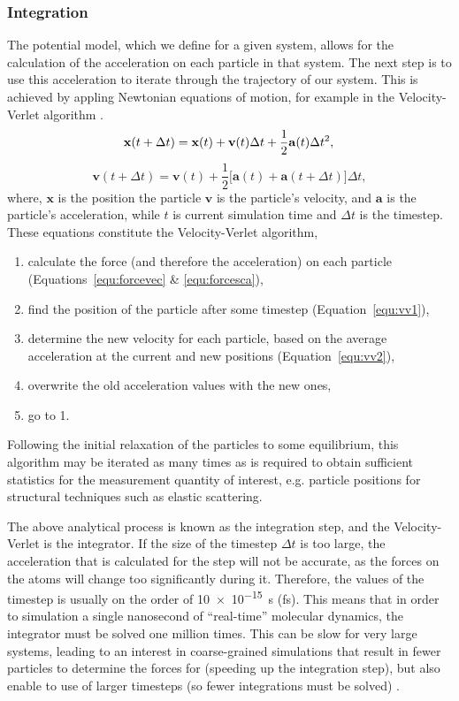 \subsubsection{Integration}
The potential model, which we define for a given system, allows for the calculation of the acceleration on each particle in that system.
The next step is to use this acceleration to iterate through the trajectory of our system.
This is achieved by appling Newtonian equations of motion, for example in the Velocity-Verlet algorithm \cite{swope_computer_1982}.
%
\begin{equation}
\mathbf{x}(t + \Delta t) = \mathbf{x}(t) + \mathbf{v}(t)\Delta t + \frac{1}{2}\mathbf{a}(t)\Delta t^2, \\
\label{equ:vv1}
\end{equation}
\begin{equation}
\mathbf{v}(t + \Delta t) = \mathbf{v}(t) + \frac{1}{2}\big[\mathbf{a}(t) + \mathbf{a}(t+\Delta t)\big]\Delta t,
\label{equ:vv2}
\end{equation}
%
where, $\mathbf{x}$ is the position the particle $\mathbf{v}$ is the particle's velocity, and $\mathbf{a}$ is the particle's acceleration, while $t$ is current simulation time and $\Delta t$ is the timestep.
These equations constitute the Velocity-Verlet algorithm,
%
\begin{enumerate}
\item calculate the force (and therefore the acceleration) on each particle (Equations~\ref{equ:forcevec} \& \ref{equ:forcesca}),
\item find the position of the particle after some timestep (Equation~\ref{equ:vv1}),
\item determine the new velocity for each particle, based on the average acceleration at the current and new positions (Equation~\ref{equ:vv2}),
\item overwrite the old acceleration values with the new ones,
\item go to 1.
\end{enumerate}
%
Following the initial relaxation of the particles to some equilibrium, this algorithm may be iterated as many times as is required to obtain sufficient statistics for the measurement quantity of interest, e.g. particle positions for structural techniques such as elastic scattering.

The above analytical process is known as the integration step, and the Velocity-Verlet is the integrator.
If the size of the timestep $\Delta t$ is too large, the acceleration that is calculated for the step will not be accurate, as the forces on the atoms will change too significantly during it.
Therefore, the values of the timestep is usually on the order of \SI{10e-15}{\second} (\si{\femto\second}).
This means that in order to simulation a single nanosecond of ``real-time'' molecular dynamics, the integrator must be solved one million times.
This can be slow for very large systems, leading to an interest in coarse-grained simulations that result in fewer particles to determine the forces for (speeding up the integration step), but also enable to use of larger timesteps (so fewer integrations must be solved) \cite{rudd_coarse-grained_1998,brini_systematic_2013}.

